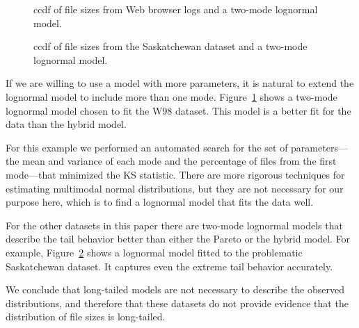 \documentclass[10pt,twocolumn]{article}
\begin{document}
\begin{figure}[tb]
\centerline{}
\caption{
ccdf of file sizes from Web browser logs
and a two-mode lognormal model.}
\label{fig.w98}
\end{figure}

\begin{figure}[tb]
\centerline{}
\caption{
ccdf of file sizes from the Saskatchewan dataset
and a two-mode lognormal model.}
\label{fig.usask.mix}
\end{figure}

If we are willing to use a model with more parameters, it is natural
to extend the lognormal model to include more than one mode.
Figure~\ref{fig.w98} shows a two-mode lognormal model chosen to fit
the W98 dataset.  This model is a better fit for the data than the
hybrid model.

For this example we performed an automated search for the set of
parameters---the mean and variance of each mode and the percentage of
files from the first mode---that minimized the KS statistic.  There
are more rigorous techniques for estimating multimodal normal
distributions, but they are not necessary for our purpose here, which
is to find a lognormal model that fits the data well.

For the other datasets in this paper there are two-mode
lognormal models that describe the tail behavior better than
either the Pareto or the hybrid model.  For example,
Figure~\ref{fig.usask.mix} shows a lognormal model fitted to
the problematic Saskatchewan dataset.  It captures even the
extreme tail behavior accurately.

We conclude that long-tailed models are not necessary to
describe the observed distributions, and therefore that these
datasets do not provide evidence that the distribution of
file sizes is long-tailed.


\end{document}
